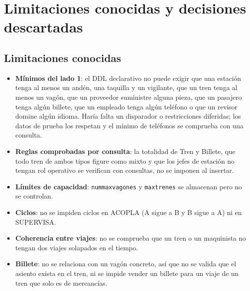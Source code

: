 \documentclass[11pt,a4paper]{article}
\DeclareRobustCommand{\_}{\textunderscore\allowbreak}
\newcommand{\tb}[1]{\texttt{#1}}
\begin{document}
\section{Limitaciones conocidas y decisiones descartadas}
\subsection{Limitaciones conocidas}
\begin{itemize}
\item \textbf{Mínimos del lado 1}: el DDL declarativo no puede exigir que una estación tenga al menos un andén, una taquilla y un vigilante, que un tren tenga al menos un vagón, que un proveedor suministre alguna pieza, que un pasajero tenga algún billete, que un empleado tenga algún teléfono o que un revisor domine algún idioma. Haría falta un disparador o restricciones diferidas; los datos de prueba los respetan y el mínimo de teléfonos se comprueba con una consulta.
\item \textbf{Reglas comprobadas por consulta}: la totalidad de Tren y Billete, que todo tren de ambos tipos figure como mixto y que los jefes de estación no tengan rol operativo se verifican con consultas, no se imponen al insertar.
\item \textbf{Límites de capacidad}: \tb{num\_max\_vagones} y \tb{max\_trenes} se almacenan pero no se controlan.
\item \textbf{Ciclos}: no se impiden ciclos en ACOPLA (A sigue a B y B sigue a A) ni en SUPERVISA.
\item \textbf{Coherencia entre viajes}: no se comprueba que un tren o un maquinista no tengan dos viajes solapados en el tiempo.
\item \textbf{Billete}: no se relaciona con un vagón concreto, así que no se valida que el asiento exista en el tren, ni se impide vender un billete para un viaje de un tren que solo es de mercancías.
\end{itemize}
\end{document}

